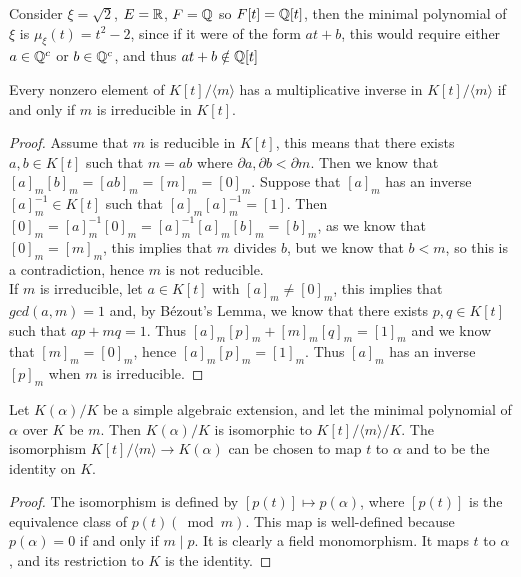 \begin{example}
    Consider $\xi = \sqrt{2}$, $E=\mathbb R$, $F = \mathbb Q$ so $F[t]=\mathbb Q[t]$, then the minimal polynomial of $\xi$ is $\mu_\xi(t)=t^2-2$, since if it were of the form $at+b$, this would require either $a \in \mathbb Q^c$ or $b \in \mathbb Q^c$, and thus $at+b \notin \mathbb Q[t]$
\end{example}


\begin{theorem}
    Every nonzero element of $K[t] /\langle m\rangle$ has a multiplicative inverse in $K[t] /\langle m\rangle$ if and only if $m$ is irreducible in $K[t]$.
\end{theorem}

\begin{proof}
    Assume that \(m\) is reducible in \(K[t]\), this means that there exists \(a,b \in K[t]\) such that \(m = ab\) where \(\partial a,\partial b < \partial m\). Then we know that \([a]_m[b]_m = [ab]_m = [m]_m = [0]_m\). Suppose that \([a]_m\) has an inverse \([a]_m^{-1} \in K[t]\) such that \([a]_m[a]_m^{-1} = [1]\). Then \([0]_m = [a]_m^{-1}[0]_m = [a]_m^{-1}[a]_m[b]_m = [b]_m\), as we know that \([0]_m = [m]_m\), this implies that \(m\) divides \(b\), but we know that \(b < m\), so this is a contradiction, hence \(m\) is not reducible. \\
    If \(m\) is irreducible, let \(a \in K[t]\) with \([a]_m \neq [0]_m\), this implies that \(gcd(a,m)=1\) and, by Bézout's Lemma, we know that there exists \(p,q \in K[t]\) such that \(ap + mq = 1\). Thus \([a]_m[p]_m + [m]_m[q]_m = [1]_m\) and we know that \([m]_m = [0]_m\), hence \([a]_m[p]_m = [1]_m\). Thus \([a]_m\) has an inverse \([p]_m\) when \(m\) is irreducible.
\end{proof}

\begin{theorem}
    Let $K(\alpha) / K$ be a simple algebraic extension, and let the minimal polynomial of $\alpha$ over $K$ be $m$. Then $K(\alpha) / K$ is isomorphic to $K[t] /\langle m\rangle / K$. The isomorphism $K[t] /\langle m\rangle \rightarrow K(\alpha)$ can be chosen to map $t$ to $\alpha$ and to be the identity on $K$.
\end{theorem}

\begin{proof}
The isomorphism is defined by $[p(t)] \mapsto p(\alpha)$, where $[p(t)]$ is the equivalence class of $p(t)(\bmod m)$. This map is well-defined because $p(\alpha)=0$ if and only if $m \mid p$. It is clearly a field monomorphism. It maps $t$ to $\alpha$, and its restriction to $K$ is the identity.
\end{proof}

